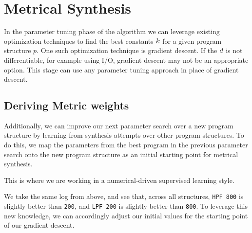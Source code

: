 \section{Metrical Synthesis}
\label{sec:opt}

In the parameter tuning phase of the algorithm we can leverage existing optimization techniques to find the best constants ${k}$ for a given program structure $p$.
One such optimization technique is gradient descent.
If the ${d}$ is not differentiable, for example using I/O, gradient descent may not be an appropriate option.
This stage can use any parameter tuning approach in place of gradient descent.

\subsection{Deriving Metric weights}
Additionally, we can improve our next parameter search over a new program structure by learning from synthesis attempts over other program structures.
To do this, we map the parameters from the best program in the previous parameter search onto the new program structure as an initial starting point for metrical synthesis.

This is where we are working in a numerical-driven supervised learning style.

\begin{exmp}
We take the same log from above, and see that, across all structures, \texttt{HPF 800} is slightly better than \texttt{200}, 
  and \texttt{LPF 200} is slightly better than \texttt{800}.
To leverage this new knowledge, we can accordingly adjust our initial values for the starting point of our gradient descent.
\end{exmp}

